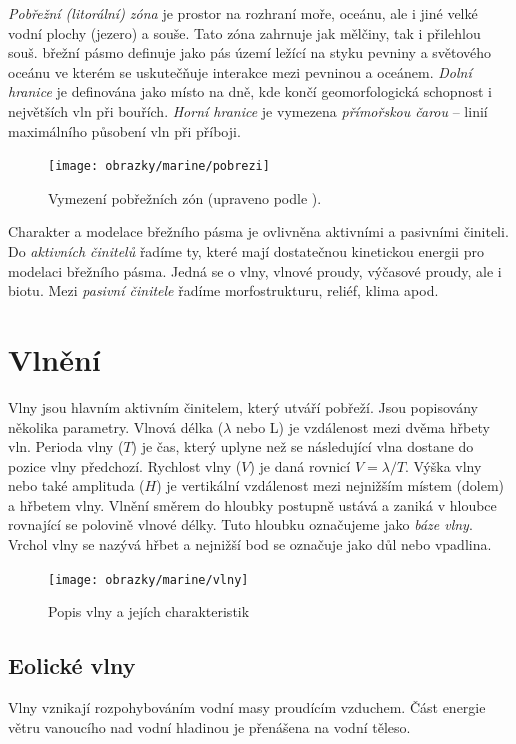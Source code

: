 \emph{Pobřežní (litorální) zóna} je prostor na rozhraní moře, oceánu, ale i jiné velké vodní plochy (jezero) a souše. Tato zóna zahrnuje jak mělčiny, tak i přilehlou souš. \textcite{demekObecnaGeomorfologie1987} břežní pásmo definuje jako pás území ležící na styku pevniny a světového oceánu ve kterém se uskutečňuje interakce mezi pevninou a oceánem. \emph{Dolní hranice} je definována jako místo na dně, kde končí geomorfologická schopnost i největších vln při bouřích. \emph{Horní hranice} je vymezena \emph{přímořskou čarou} -- linií maximálního působení vln při příboji. 

\begin{figure}[h]
	\centering
	\texttt{[image: obrazky/marine/pobrezi]}
	\caption{Vymezení pobřežních zón (upraveno podle \textcite{birdCoastalGeomorphologyIntroduction2008}).
		}
	\label{fig:pobrezi}
\end{figure}

Charakter a modelace břežního pásma je ovlivněna aktivními a pasivními činiteli. Do \emph{aktivních činitelů} řadíme ty, které mají dostatečnou kinetickou energii pro modelaci břežního pásma. Jedná se o vlny, vlnové proudy, výčasové proudy, ale i biotu. Mezi \emph{pasivní činitele} řadíme morfostrukturu, reliéf, klima apod. 

\section{Vlnění}
Vlny jsou hlavním aktivním činitelem, který utváří pobřeží. Jsou popisovány několika parametry. Vlnová délka ($\lambda$ nebo L) je vzdálenost mezi dvěma hřbety vln. Perioda vlny ($T$) je čas, který uplyne než se následující vlna dostane do pozice vlny předchozí. Rychlost vlny ($V$) je daná rovnicí $V = \lambda/T$.  Výška vlny nebo také amplituda ($H$) je vertikální vzdálenost mezi nejnižším místem (dolem) a hřbetem vlny. Vlnění směrem do hloubky postupně ustává a zaniká v hloubce rovnající se polovině vlnové délky. Tuto hloubku označujeme jako \emph{báze vlny}. Vrchol  vlny se nazývá hřbet a nejnižší bod se označuje jako důl nebo vpadlina. 

\begin{figure}[h]
	\centering
	\texttt{[image: obrazky/marine/vlny]}
	\caption{Popis vlny a jejích charakteristik}
	\label{fig:vlny}
\end{figure}



\subsection{Eolické vlny}
Vlny vznikají rozpohybováním vodní masy proudícím vzduchem. Část energie větru vanoucího nad vodní hladinou je přenášena na vodní těleso. 

